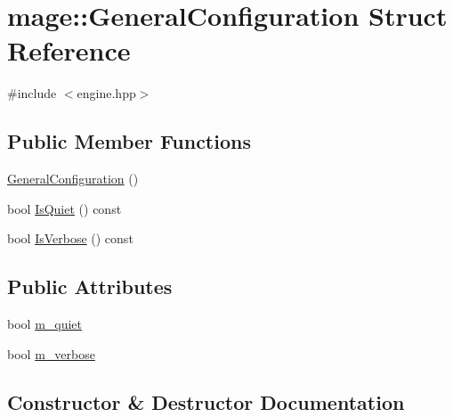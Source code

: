 \hypertarget{structmage_1_1_general_configuration}{}\section{mage\+:\+:General\+Configuration Struct Reference}
\label{structmage_1_1_general_configuration}


{\ttfamily \#include $<$engine.\+hpp$>$}

\subsection*{Public Member Functions}
\begin{DoxyCompactItemize}
\item 
\hyperlink{structmage_1_1_general_configuration_a9a8040da771683b795ad9016ed0dd733}{General\+Configuration} ()
\item 
bool \hyperlink{structmage_1_1_general_configuration_a51e37e3d7473c16fa90efa7501f54ebc}{Is\+Quiet} () const
\item 
bool \hyperlink{structmage_1_1_general_configuration_affb1e42d744f4f75d244dc63278a4e94}{Is\+Verbose} () const
\end{DoxyCompactItemize}
\subsection*{Public Attributes}
\begin{DoxyCompactItemize}
\item 
bool \hyperlink{structmage_1_1_general_configuration_aaa638cb4be1dfc8d3af3fddfb7933773}{m\+\_\+quiet}
\item 
bool \hyperlink{structmage_1_1_general_configuration_aacc88850ee46834ab0ee52bbfa8a3a80}{m\+\_\+verbose}
\end{DoxyCompactItemize}


\subsection{Constructor \& Destructor Documentation}
\hypertarget{structmage_1_1_general_configuration_a9a8040da771683b795ad9016ed0dd733}{}\label{structmage_1_1_general_configuration_a9a8040da771683b795ad9016ed0dd733} 
